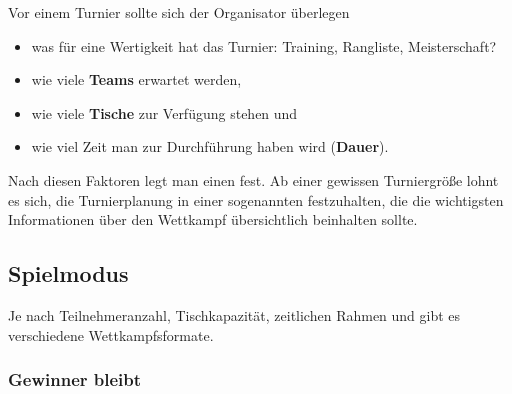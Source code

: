 Vor einem Turnier sollte sich der Organisator überlegen
\begin{itemize}
\item was für eine Wertigkeit hat das Turnier: Training, Rangliste, Meisterschaft?
\item wie viele {\bf Teams} erwartet werden, 
\item wie viele {\bf Tische} zur Verfügung stehen und
\item wie viel Zeit man zur Durchführung haben wird ({\bf Dauer}).
\end{itemize}
Nach diesen Faktoren legt man einen  fest. 
Ab einer gewissen Turniergröße lohnt es sich, die Turnierplanung in einer sogenannten  festzuhalten, die die wichtigsten Informationen über den Wettkampf übersichtlich beinhalten sollte.

\subsection{Spielmodus}
\label{turniere:vorbereitung:modus}

Je nach Teilnehmeranzahl, Tischkapazität, zeitlichen Rahmen und
gibt es verschiedene Wettkampfsformate.


\subsubsection{Gewinner bleibt}
\label{turniere:vorbereitung:modus:fordern}

